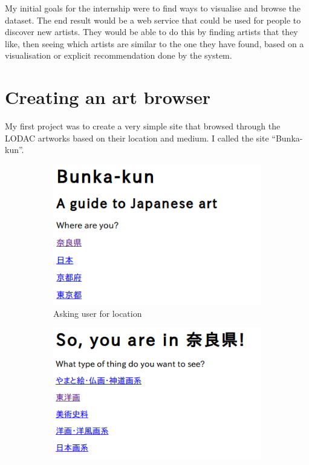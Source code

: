 \documentclass[11pt]{article}
\begin{document}
My initial goals for the internship were to find ways to visualise and browse the dataset. The end result would be a web service that could be used for people to discover new artists. They would be able to do this by finding artists that they like, then seeing which artists are similar to the one they have found, based on a visualisation or explicit recommendation done by the system.

\section{Creating an art browser}
My first project was to create a very simple site that browsed through the LODAC artworks based on their location and medium. I called the site ``Bunka-kun''.

\begin{figure}
  \centering
  \begin{subfigure}[b]{0.4\textwidth}
          \includegraphics[width=\textwidth]{bunka1.png}
          \caption{Asking user for location}
          \label{fig:bunka1}
  \end{subfigure}
  \begin{subfigure}[b]{0.4\textwidth}
    \includegraphics[width=\textwidth]{bunka2.png}

\end{subfigure}
\end{figure}
\end{document}
